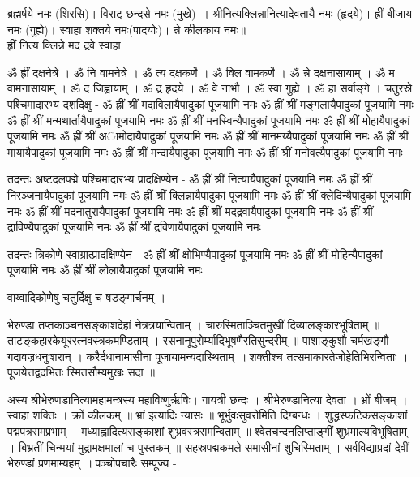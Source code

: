 ब्रह्मर्षये नमः (शिरसि)। विराट्-छन्दसे नमः (मुखे)~। श्रीनित्यक्लिन्नानित्यादेवतायै नमः (हृदये)। ह्रीं बीजाय नमः (गुह्ये)। स्वाहा शक्तये नमः(पादयोः)।
न्ने कीलकाय नमः॥\\
ह्रीं नित्य क्लिन्ने मद द्रवे स्वाहा 


ॐ ह्रीं दक्षनेत्रे । ॐ नि वामनेत्रे । ॐ त्य दक्षकर्णे । ॐ क्लि वामकर्णे । ॐ न्ने दक्षनासायाम् । ॐ म वामनासायाम् । ॐ द जिह्वायाम् । ॐ द्र हृदये । ॐ वे नाभौ । ॐ स्वा गुह्ये । ॐ हा सर्वाङ्गे ।
चतुरस्रे पश्चिमादारभ्य दशदिक्षु -
ॐ ह्रीं श्रीं मदाविलायैपादुकां पूजयामि नमः
ॐ ह्रीं श्रीं मङ्गलायैपादुकां पूजयामि नमः
ॐ ह्रीं श्रीं मन्मथार्तायैपादुकां पूजयामि नमः
ॐ ह्रीं श्रीं मनस्विन्यैपादुकां पूजयामि नमः
ॐ ह्रीं श्रीं मोहायैपादुकां पूजयामि नमः
ॐ ह्रीं श्रीं अामोदायैपादुकां पूजयामि नमः
ॐ ह्रीं श्रीं मानमय्यैपादुकां पूजयामि नमः
ॐ ह्रीं श्रीं मायायैपादुकां पूजयामि नमः
ॐ ह्रीं श्रीं मन्दायैपादुकां पूजयामि नमः
ॐ ह्रीं श्रीं मनोवत्यैपादुकां पूजयामि नमः

तदन्तः अष्टदलपद्मे पश्चिमादारभ्य प्रादक्षिण्येन -
ॐ ह्रीं श्रीं नित्यायैपादुकां पूजयामि नमः
ॐ ह्रीं श्रीं निरञ्जनायैपादुकां पूजयामि नमः
ॐ ह्रीं श्रीं क्लिन्नायैपादुकां पूजयामि नमः
ॐ ह्रीं श्रीं क्लेदिन्यैपादुकां पूजयामि नमः
ॐ ह्रीं श्रीं मदनातुरायैपादुकां पूजयामि नमः
ॐ ह्रीं श्रीं मदद्रवायैपादुकां पूजयामि नमः
ॐ ह्रीं श्रीं द्राविण्यैपादुकां पूजयामि नमः
ॐ ह्रीं श्रीं द्रविणायैपादुकां पूजयामि नमः

तदन्तः त्रिकोणे स्वाग्रात्प्रादक्षिण्येन -
ॐ ह्रीं श्रीं क्षोभिण्यैपादुकां पूजयामि नमः
ॐ ह्रीं श्रीं मोहिन्यैपादुकां पूजयामि नमः
ॐ ह्रीं श्रीं लोलायैपादुकां पूजयामि नमः

वाय्वादिकोणेषु चतुर्दिक्षु च षडङ्गार्चनम् ।

भेरुण्डा
तप्तकाञ्चनसङ्काशदेहां नेत्रत्रयान्विताम्  ।
चारुस्मिताञ्चितमुखीं दिव्यालङ्कारभूषिताम्  ॥
ताटङ्कहारकेयूररत्नवस्त्रकमण्डिताम्  ।
रसनानूपुरोर्म्यादिभूषणैरतिसुन्दरीम्  ॥
पाशाङ्कुशौ चर्मखङ्गौ गदावज्रधनुःशरान्  ।
करैर्दधानामासीना पूजायामन्यदास्थिताम् ॥
शक्तीश्च तत्समाकारतेजोहेतिभिरन्विताः ।
पूजयेत्तद्वदभितः स्मितसौम्यमुखः सदा ॥

अस्य श्रीभेरुणडानित्यामहामन्त्रस्य महाविष्णुर्ऋषिः। गायत्री छन्दः । श्रीभेरुण्डानित्या देवता । भ्रों बीजम् । स्वाहा शक्तिः । क्रों कीलकम् ॥
भ्रां इत्यादिः न्यासः ॥
भूर्भुवःसुवरोमिति दिग्बन्धः ।
शुद्धस्फटिकसङ्काशां पद्मपत्रसमप्रभाम् । मध्याह्नादित्यसङ्काशां शुभ्रवस्त्रसमन्विताम् ॥
श्वेतचन्दनलिप्ताङ्गीं शुभ्रमाल्यविभूषिताम् । बिभ्रतीं चिन्मयां मुद्रामक्षमालां च पुस्तकम् ॥
सहस्रपद्मकमले समासीनां शुचिस्मिताम् । सर्वविद्याप्रदां देवीं भेरुण्डां प्रणमाम्यहम् ॥
पञ्चोपचारैः सम्पूज्य -

